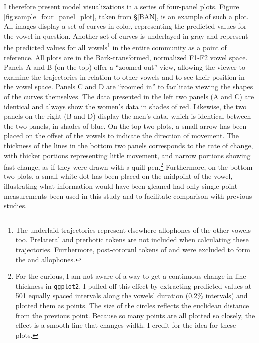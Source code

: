 I therefore present model visualizations in a series of four-panel plots. Figure \ref{fig:sample_four_panel_plot}, taken from \S\ref{BAN}, is an example of such a plot. All images display a set of curves in color, representing the predicted values for the vowel in question. Another set of curves is underlayed in gray and represent the predicted values for all vowels\footnote{The underlaid trajectories represent elsewhere allophones of the other vowels too. Prelateral and prerhotic tokens are not included when calculating these trajectories. Furthermore, post-cororanl tokens of \goose and \goat were excluded to form the \boot and \boat allophones.} in the entire community as a point of reference. All plots are in the Bark-transformed, normalized F1-F2 vowel space. Panels A and B (on the top) offer a ``zoomed out'' view, allowing the viewer to examine the trajectories in relation to other vowels and to see their position in the vowel space. Panels C and D are ``zoomed in'' to facilitate viewing the shapes of the curves themselves. The data presented in the left two panels (A and C) are identical and always show the women’s data in shades of red. Likewise, the two panels on the right (B and D) display the men’s data, which is identical between the two panels, in shades of blue. On the top two plots, a small arrow has been placed on the offset of the vowels to indicate the direction of movement. The thickness of the lines in the bottom two panels corresponds to the rate of change, with thicker portions representing little movement, and narrow portions showing fast change, as if they were drawn with a quill pen.\footnote{For the curious, I am not aware of a way to get a continuous change in line thickness in \texttt{ggplot2}. I pulled off this effect by extracting predicted values at 501 equally spaced intervals along the vowels' duration (0.2\% intervals) and plotted them as points. The size of the circles reflects the euclidean distance from the previous point. Because so many points are all plotted so closely, the effect is a smooth line that changes width. I credit \citet{fruehwald_2017_gamm} for the idea for these plots.} Furthermore, on the bottom two plots, a small white dot has been placed on the midpoint of the vowel, illustrating what information would have been gleaned had only single-point measurements been used in this study and to facilitate comparison with previous studies.

